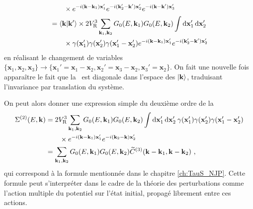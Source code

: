 \begin{align}
&\nonumber \qquad\times e^{-i(\mathbf{k}-\mathbf{k}_{\mathrm{1}})\mathbf{x}_{\mathrm{1}}'} e^{-i(\mathbf{k}_{\mathrm{2}}'-\mathbf{k}')\mathbf{x}_{\mathrm{2}}'} e^{-i(\mathbf{k}-\mathbf{k}')\mathbf{x}_{\mathrm{3}}'} \\
&=\langle \mathbf{k} | \mathbf{k}'\rangle \times 2 V_{\mathrm{R}}^3 \sum_{\mathbf{k}_{\mathrm{1}},\mathbf{k}_{\mathrm{2}}}{G_0(E,\mathbf{k}_{\mathrm{1}}) G_0(E,\mathbf{k}_{\mathrm{2}})} \int{\mathop{}\mathopen{}\mathrm{d}\mathbf{x}_{\mathrm{1}}'\mathop{}\mathopen{}\mathrm{d}\mathbf{x}_{\mathrm{2}}'} \\
&\nonumber \qquad\times \gamma(\mathbf{x}_{\mathrm{1}}')\gamma(\mathbf{x}_{\mathrm{2}}')\gamma(\mathbf{x}_{\mathrm{1}}'-\mathbf{x}_{\mathrm{2}}') e^{-i(\mathbf{k}-\mathbf{k}_{\mathrm{1}})\mathbf{x}_{\mathrm{1}}'} e^{-i(\mathbf{k}_{\mathrm{2}}'-\mathbf{k}')\mathbf{x}_{\mathrm{2}}'}
\end{align}
en réalisant le changement de variables $\lbrace \mathbf{x}_{\mathrm{1}},\mathbf{x}_{\mathrm{2}},\mathbf{x}_{\mathrm{3}}\rbrace \rightarrow \lbrace \mathbf{x}_{\mathrm{1}}'=\mathbf{x}_{\mathrm{1}}-\mathbf{x}_{\mathrm{2}}, \mathbf{x}_{\mathrm{2}}'=\mathbf{x}_{\mathrm{3}}-\mathbf{x}_{\mathrm{2}}, \mathbf{x}_{\mathrm{3}}'=\mathbf{x}_{\mathrm{2}}\rbrace$. On fait une nouvelle fois apparaître le fait que la \selfenergy\ est diagonale dans l'espace des $\left| \mathbf{k} \right\rangle$, traduisant l'invariance par translation du système. 

On peut alors donner une expression simple du deuxième ordre de la \selfenergy
\begin{align}
\Sigma^{(2)}(E,\mathbf{k})&= 2V_{\mathrm{R}}^3 \sum_{\mathbf{k}_{\mathrm{1}},\mathbf{k}_{\mathrm{2}}}{G_0(E,\mathbf{k}_{\mathrm{1}}) G_0(E,\mathbf{k}_{\mathrm{2}})} \int{\mathop{}\mathopen{}\mathrm{d}\mathbf{x}_{\mathrm{1}}' \mathop{}\mathopen{}\mathrm{d}\mathbf{x}_{\mathrm{2}}' \: \gamma(\mathbf{x}_{\mathrm{1}}')\gamma(\mathbf{x}_{\mathrm{2}}')\gamma(\mathbf{x}_{\mathrm{1}}'-\mathbf{x}_{\mathrm{2}}')}\\
&\nonumber\qquad\times e^{-i(\mathbf{k}-\mathbf{k}_{\mathrm{1}})\mathbf{x}_{\mathrm{1}}'} e^{-i(\mathbf{k}_{\mathrm{2}}-\mathbf{k})\mathbf{x}_{\mathrm{2}}'} \\
&= \sum_{\mathbf{k}_{\mathrm{1}},\mathbf{k}_{\mathrm{2}}}{G_0(E,\mathbf{k}_{\mathrm{1}}) G_0(E,\mathbf{k}_{\mathrm{2}}) \widetilde{C}^{(3)}(\mathbf{k}-\mathbf{k}_{\mathrm{1}},\mathbf{k}-\mathbf{k}_{\mathrm{2}})} \text{ ,}
\end{align}
qui correspond à la formule mentionnée dans le chapitre \ref{ch:TauS_NJP}. Cette formule peut s'interpréter dans le cadre de la théorie des perturbations comme l'action multiple du potentiel sur l'état initial, propagé librement entre ces actions.



